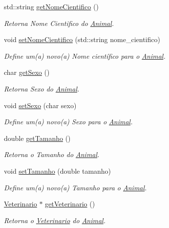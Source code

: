 \begin{DoxyCompactItemize}
std\+::string \hyperlink{classAnimal_a9b316bf80a121cd5dc077158055c162f}{get\+Nome\+Cientifico} ()
\begin{DoxyCompactList}\small\item\em Retorna Nome Cientifico do \hyperlink{classAnimal}{Animal}. \end{DoxyCompactList}\item 
void \hyperlink{classAnimal_ad2e0ffb0dcb6b58467010d9f11488899}{set\+Nome\+Cientifico} (std\+::string nome\+\_\+cientifico)
\begin{DoxyCompactList}\small\item\em Define um(a) novo(a) Nome científico para o \hyperlink{classAnimal}{Animal}. \end{DoxyCompactList}\item 
char \hyperlink{classAnimal_a7349027418d900a9cd7cfc32001b6f7d}{get\+Sexo} ()
\begin{DoxyCompactList}\small\item\em Retorna Sexo do \hyperlink{classAnimal}{Animal}. \end{DoxyCompactList}\item 
void \hyperlink{classAnimal_aab32d5ad6689a4e19cfd43a303c939af}{set\+Sexo} (char sexo)
\begin{DoxyCompactList}\small\item\em Define um(a) novo(a) Sexo para o \hyperlink{classAnimal}{Animal}. \end{DoxyCompactList}\item 
double \hyperlink{classAnimal_a3936ff4ad07fee3173db2a9dff52c706}{get\+Tamanho} ()
\begin{DoxyCompactList}\small\item\em Retorna o Tamanho do \hyperlink{classAnimal}{Animal}. \end{DoxyCompactList}\item 
void \hyperlink{classAnimal_a53daf7711c6b6430c723647b2cec7c36}{set\+Tamanho} (double tamanho)
\begin{DoxyCompactList}\small\item\em Define um(a) novo(a) Tamanho para o \hyperlink{classAnimal}{Animal}. \end{DoxyCompactList}\item 
\hyperlink{classVeterinario}{Veterinario} $\ast$ \hyperlink{classAnimal_a9bdff52128e0ae23bbcac796b68a4d05}{get\+Veterinario} ()
\begin{DoxyCompactList}\small\item\em Retorna o \hyperlink{classVeterinario}{Veterinario} do \hyperlink{classAnimal}{Animal}. \end{DoxyCompactList}\item 

\end{DoxyCompactItemize}
